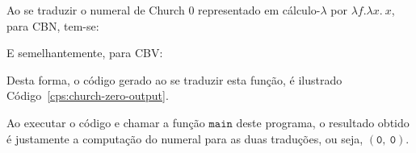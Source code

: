 Ao se traduzir o numeral de Church 0 representado em cálculo-$\lambda$ por $\lambda f.\lambda x.\ x$, para CBN, tem-se:

E semelhantemente, para CBV:

Desta forma, o código gerado ao se traduzir esta função, é ilustrado Código~\ref{cps:church-zero-output}.

Ao executar o código e chamar a função $\mathtt{main}$ deste programa, o resultado obtido é justamente a computação do numeral para as duas traduções, ou seja, $\mathtt{(0,\ 0)}$.
